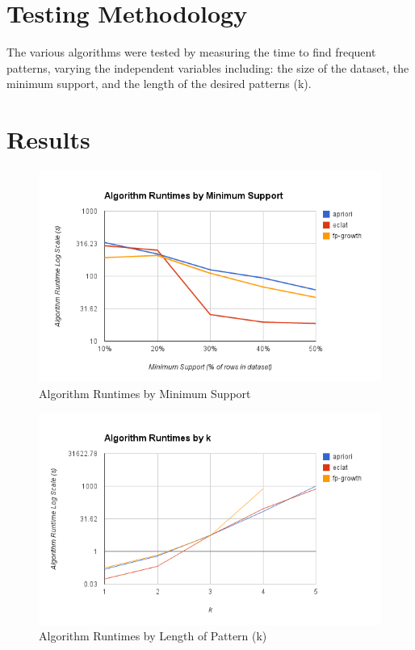 \documentclass[11pt]{article}
\begin{document}
\begin{multicols}{2}
\section{Testing Methodology}

The various algorithms were tested by measuring the time to find
frequent patterns, varying the independent variables including: the
size of the dataset, the minimum support, and the length of the
desired patterns (k).

\section{Results}
\label{sec:results}

\begin{center}
\begin{figure}
\includegraphics[scale=0.9]{../figs/runtimes_by_min_sup.png}
\caption{Algorithm Runtimes by Minimum Support}
\end{figure}
\end{center}

\begin{center}
\begin{figure}
\includegraphics[scale=0.9]{../figs/runtimes_by_k.png}
\caption{Algorithm Runtimes by Length of Pattern (k)}
\end{figure}
\end{center}


\end{multicols}
\end{document}
